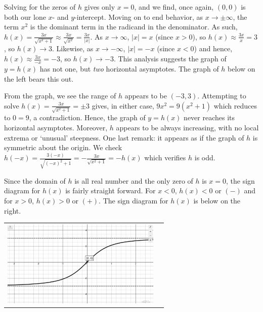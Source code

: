 \begin{ex}
\begin{enumerate}
Solving for the zeros of $h$ gives only $x = 0$, and we find, once again, $(0,0)$ is both our lone $x$- and $y$-intercept.  Moving on to end behavior, as $x \rightarrow \pm \infty$, the term $x^2$ is the dominant term in the radicand in the denominator. As such, $h(x) = \frac{3x}{\sqrt{x^2 + 1}} \approx \frac{3x}{\sqrt{x^2}} = \frac{3x}{|x|}$.  As $x \rightarrow \infty$, $|x| = x$ (since $x>0$), so $h(x) \approx \frac{3x}{x} = 3$, so $h(x) \rightarrow 3$.  Likewise, as $x \rightarrow -\infty$, $|x| = -x$ (since $x<0$) and hence, $h(x)\approx  \frac{3x}{-x} = -3$, so $h(x) \rightarrow -3$.  This analysis suggests the graph of $y=h(x)$ has not one, but \textit{two} horizontal asymptotes. The graph of $h$ below on the left bears this out.

From the graph, we see the range of $h$ appears to be $(-3,3)$.  Attempting to solve $h(x) = \frac{3x}{\sqrt{x^2 + 1}} = \pm 3$ gives, in either case, $9x^2 = 9(x^2+1)$ which reduces to $0 = 9$, a contradiction.  Hence, the graph of $y = h(x)$ never reaches its horizontal asymptotes. Moreover, $h$ appears to be always increasing, with no local extrema or `unusual' steepness.  One last remark:  it appears as if the graph of $h$ is symmetric about the origin.  We check $h(-x) = \frac{3(-x)}{\sqrt{(-x)^2+1}} = - \frac{3x}{\sqrt{x^2 + 1}} = -h(x)$ which verifies $h$ is odd.

\smallskip

Since the domain of $h$ is all real number and the only zero of $h$ is $x=0$, the sign diagram for $h(x)$ is fairly straight forward.  For $x<0$, $h(x)<0$ or $(-)$ and for $x>0$, $h(x) >0$ or $(+)$.  The sign diagram for $h(x)$ is below on the right.

\begin{center}

\begin{tabular}{cc}

\includegraphics[width=3in]{./RootRadicalFunctionsGraphics/RadicalGraphEx03.jpg} &


\end{tabular}
\end{center}
\end{enumerate}
\end{ex}
